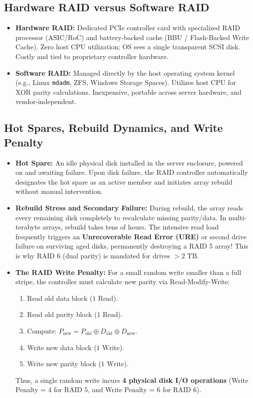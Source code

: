 \subsection{Hardware RAID versus Software RAID}
\begin{itemize}
    \item \textbf{Hardware RAID:} Dedicated PCIe controller card with specialized RAID processor (ASIC/RoC) and battery-backed cache (BBU / Flash-Backed Write Cache). Zero host CPU utilization; OS sees a single transparent SCSI disk. Costly and tied to proprietary controller hardware.
    \item \textbf{Software RAID:} Managed directly by the host operating system kernel (e.g., Linux \texttt{mdadm}, ZFS, Windows Storage Spaces). Utilizes host CPU for XOR parity calculations. Inexpensive, portable across server hardware, and vendor-independent.
\end{itemize}

\subsection{Hot Spares, Rebuild Dynamics, and Write Penalty}
\begin{itemize}
    \item \textbf{Hot Spare:} An idle physical disk installed in the server enclosure, powered on and awaiting failure. Upon disk failure, the RAID controller automatically designates the hot spare as an active member and initiates array rebuild without manual intervention.
    \item \textbf{Rebuild Stress and Secondary Failure:} During rebuild, the array reads every remaining disk completely to recalculate missing parity/data. In multi-terabyte arrays, rebuild takes tens of hours. The intensive read load frequently triggers an \textbf{Unrecoverable Read Error (URE)} or second drive failure on surviving aged disks, permanently destroying a RAID 5 array! This is why RAID 6 (dual parity) is mandated for drives $> 2\text{ TB}$.
    \item \textbf{The RAID Write Penalty:}
    For a small random write smaller than a full stripe, the controller must calculate new parity via Read-Modify-Write:
    \begin{enumerate}
        \item Read old data block ($1\text{ Read}$).
        \item Read old parity block ($1\text{ Read}$).
        \item Compute: $P_{\text{new}} = P_{\text{old}} \oplus D_{\text{old}} \oplus D_{\text{new}}$.
        \item Write new data block ($1\text{ Write}$).
        \item Write new parity block ($1\text{ Write}$).
    \end{enumerate}
    Thus, a single random write incurs \textbf{4 physical disk I/O operations} (Write Penalty = 4 for RAID 5, and Write Penalty = 6 for RAID 6).
\end{itemize}




